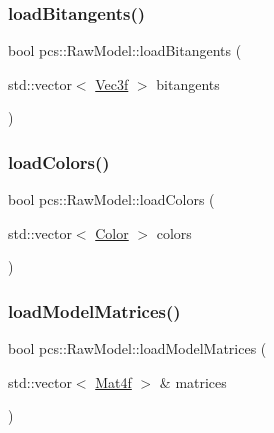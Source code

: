 \mbox{\label{classpcs_1_1RawModel_a64c1634cbeb22fc4b087f24cac6ba242}} 
\subsubsection{\texorpdfstring{load\+Bitangents()}{loadBitangents()}}
{\footnotesize\ttfamily bool pcs\+::\+Raw\+Model\+::load\+Bitangents (\begin{DoxyParamCaption}\item[{std\+::vector$<$ \hyperlink{namespacepcs_a68e0f517680976c17c810ffe6952cbab}{Vec3f} $>$}]{bitangents }\end{DoxyParamCaption})}

\mbox{\label{classpcs_1_1RawModel_ae62c8b9e99a8d83c79338b86bd857f0d}} 
\subsubsection{\texorpdfstring{load\+Colors()}{loadColors()}}
{\footnotesize\ttfamily bool pcs\+::\+Raw\+Model\+::load\+Colors (\begin{DoxyParamCaption}\item[{std\+::vector$<$ \hyperlink{structpcs_1_1Color}{Color} $>$}]{colors }\end{DoxyParamCaption})}

\mbox{\label{classpcs_1_1RawModel_acf35bf470e0ca38f98a53a7db7fa0a3b}} 
\subsubsection{\texorpdfstring{load\+Model\+Matrices()}{loadModelMatrices()}}
{\footnotesize\ttfamily bool pcs\+::\+Raw\+Model\+::load\+Model\+Matrices (\begin{DoxyParamCaption}\item[{std\+::vector$<$ \hyperlink{structpcs_1_1Mat4f}{Mat4f} $>$ \&}]{matrices }\end{DoxyParamCaption})}

